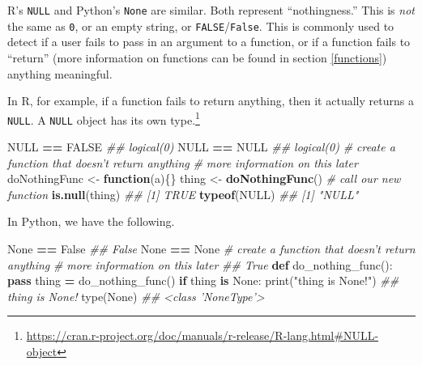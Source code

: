 \documentclass[12pt,krantz2]{krantz}
\makeatletter
\newenvironment{Shaded}{\begin{snugshade}}{\end{snugshade}}
\newcommand{\BuiltInTok}[1]{#1}
\newcommand{\CommentTok}[1]{\textcolor[rgb]{0.37,0.37,0.37}{\textit{#1}}}
\newcommand{\ControlFlowTok}[1]{\textcolor[rgb]{0.27,0.27,0.27}{\textbf{#1}}}
\newcommand{\KeywordTok}[1]{\textcolor[rgb]{0.27,0.27,0.27}{\textbf{#1}}}
\newcommand{\NormalTok}[1]{#1}
\newcommand{\OperatorTok}[1]{\textcolor[rgb]{0.43,0.43,0.43}{\textbf{#1}}}
\newcommand{\OtherTok}[1]{\textcolor[rgb]{0.37,0.37,0.37}{#1}}
\newcommand{\StringTok}[1]{\textcolor[rgb]{0.5,0.5,0.5}{#1}}
\newcommand{\VariableTok}[1]{\textcolor[rgb]{0,0,0}{#1}}
\renewcommand{\href}[2]{#2\footnote{\url{#1}}}
\newenvironment{kframe}{%
\medskip{}
\setlength{\fboxsep}{.8em}
 \def\at@end@of@kframe{}%
 \ifinner\ifhmode%
  \def\at@end@of@kframe{\end{minipage}}%
  \begin{minipage}{\columnwidth}%
 \fi\fi%
 \def\FrameCommand##1{\hskip\@totalleftmargin \hskip-\fboxsep
 \colorbox{shadecolor}{##1}\hskip-\fboxsep
     \hskip-\linewidth \hskip-\@totalleftmargin \hskip\columnwidth}%
 \MakeFramed {\advance\hsize-\width
   \@totalleftmargin\z@ \linewidth\hsize
   \@setminipage}}%
 {\par\unskip\endMakeFramed%
 \at@end@of@kframe}
\renewenvironment{Shaded}{\begin{kframe}}{\end{kframe}}
\makeatother
\begin{document}
R's \texttt{NULL} and Python's \texttt{None} are similar. Both represent ``nothingness.'' This is \emph{not} the same as \texttt{0}, or an empty string, or \texttt{FALSE}/\texttt{False}. This is commonly used to detect if a user fails to pass in an argument to a function, or if a function fails to ``return'' (more information on functions can be found in section \ref{functions}) anything meaningful.

In R, for example, if a function fails to return anything, then it actually returns a \texttt{NULL}. \href{https://cran.r-project.org/doc/manuals/r-release/R-lang.html\#NULL-object}{A \texttt{NULL} object has its own type.}

\begin{Shaded}
\begin{Highlighting}[]
\OtherTok{NULL} \OperatorTok{==}\StringTok{ }\OtherTok{FALSE}
\CommentTok{## logical(0)}
\OtherTok{NULL} \OperatorTok{==}\StringTok{ }\OtherTok{NULL}
\CommentTok{## logical(0)}
\CommentTok{# create a function that doesn't return anything}
\CommentTok{# more information on this later}
\NormalTok{doNothingFunc <-}\StringTok{ }\ControlFlowTok{function}\NormalTok{(a)\{\} }
\NormalTok{thing <-}\StringTok{ }\KeywordTok{doNothingFunc}\NormalTok{() }\CommentTok{# call our new function}
\KeywordTok{is.null}\NormalTok{(thing)}
\CommentTok{## [1] TRUE}
\KeywordTok{typeof}\NormalTok{(}\OtherTok{NULL}\NormalTok{)}
\CommentTok{## [1] "NULL"}
\end{Highlighting}
\end{Shaded}

In Python, we have the following.

\begin{Shaded}
\begin{Highlighting}[]
\VariableTok{None} \OperatorTok{==} \VariableTok{False}
\CommentTok{## False}
\VariableTok{None} \OperatorTok{==} \VariableTok{None}
\CommentTok{# create a function that doesn't return anything}
\CommentTok{# more information on this later}
\CommentTok{## True}
\KeywordTok{def}\NormalTok{ do_nothing_func():}
    \ControlFlowTok{pass}
\NormalTok{thing }\OperatorTok{=}\NormalTok{ do_nothing_func()}
\ControlFlowTok{if}\NormalTok{ thing }\KeywordTok{is} \VariableTok{None}\NormalTok{:}
    \BuiltInTok{print}\NormalTok{(}\StringTok{"thing is None!"}\NormalTok{)}
\CommentTok{## thing is None!}
\BuiltInTok{type}\NormalTok{(}\VariableTok{None}\NormalTok{)}
\CommentTok{## <class 'NoneType'>}
\end{Highlighting}
\end{Shaded}
\end{document}
